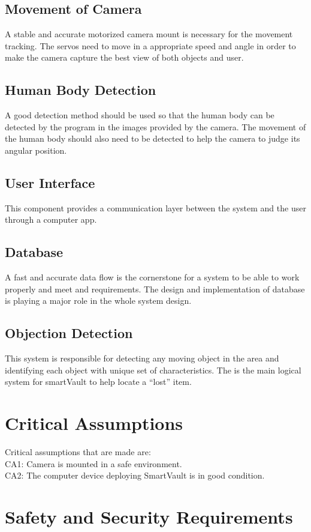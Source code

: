 \documentclass{article}
\begin{document}
\subsection{Movement of Camera}
A stable and accurate motorized camera mount is necessary for the movement tracking. The servos need to move in a appropriate speed and angle in order to make the camera capture the best view of both objects and user.
\subsection{Human Body Detection}
A good detection method should be used so that the human body can be detected by the program in the images provided by the camera. The movement of the human body should also need to be detected to help the camera to judge its angular position.
\subsection{User Interface}
This component provides a communication layer between the system and the user through a computer app.
\subsection{Database}
A fast and accurate data flow is the cornerstone for a system to be able to work properly and meet and requirements. The design and implementation of database is playing a major role in the whole system design.
\subsection{Objection Detection}
This system is responsible for detecting any moving object in the area and identifying each object with unique set of characteristics. The is the main logical system for smartVault to help locate a “lost” item.
\section{Critical Assumptions}
Critical assumptions that are made are: \\
CA1: Camera is mounted in a safe environment. \\
CA2: The computer device deploying SmartVault is in good condition.

\section{Safety and Security Requirements}
\end{document}
